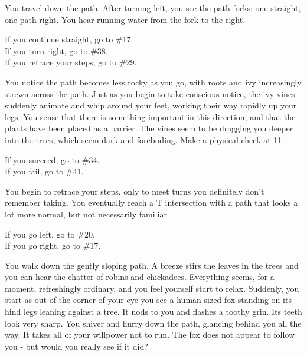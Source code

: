 \documentclass[white]{gl2018}
\begin{document}
\begin{large}
\begin{location}{6}
\begin{fromhere}
\end{fromhere}
\end{location}
\begin{location}{7}
You travel down the path. After turning left, you see the path forks: one straight, one path right. You hear running water from the fork to the right. 
\begin{fromhere}
If you continue straight, go to \#17.\\
If you turn right,  go to \#38.\\
  If you retrace your steps, go to \#29.
\end{fromhere}
\end{location}
\begin{location}{8}
You notice the path becomes less rocky as you go, with roots and ivy increasingly strewn across the path.  Just as you begin to take conscious notice, the ivy vines suddenly animate and whip around your feet, working their way rapidly up your legs.  You sense that there is something important in this direction, and that the plants have been placed as a barrier.  The vines seem to be dragging you deeper into the trees, which seem dark and foreboding.  Make a physical check at 11.
\begin{fromhere}
If you succeed, go to \#34.\\
  If you fail, go to \#41.
\end{fromhere}
\end{location}
\begin{location}{9}
You begin to retrace your steps, only to meet turns you definitely don't remember taking. You eventually reach a T intersection with a path that looks a lot more normal, but not necessarily familiar.
\begin{fromhere}
 If you go left, go to \#20.\\
 If you go right, go to \#17.
\end{fromhere}
\end{location}
\begin{location}{10}
You walk down the gently sloping path.  A breeze stirs the leaves in the trees and you can hear the chatter of robins and chickadees.  Everything seems, for a moment, refreshingly ordinary, and you feel yourself start to relax.  Suddenly, you start as out of the corner of your eye you see a human-sized fox standing on its hind legs leaning against a tree.  It nods to you and flashes a toothy grin.  Its teeth look very sharp.  You shiver and hurry down the path, glancing behind you all the way.  It takes all of your willpower not to run.  The fox does not appear to follow you - but would you really see if it did?


\end{location}
\end{large}
\end{document}
